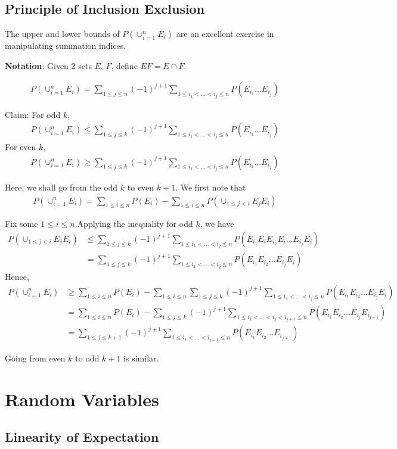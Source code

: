 \documentclass{article}
\begin{document}
\subsection{Principle of Inclusion Exclusion}
The upper and lower bounds of $P(\cup_{i=1}^n E_i)$ are an excellent exercise in manipulating summation indices.

\textbf{Notation}: Given 2 sets $E$, $F$, define $EF=E\cap F$.

\begin{align*}
	P(\cup_{i=1}^n E_i) = \sum_{1\leq j\leq n}(-1)^{j+1}\sum_{1\leq i_1 < \dots < i_j \leq n}P(E_{i_1}\dots E_{i_j})
\end{align*}

Claim:
For odd $k$,
\begin{align*}
	P(\cup_{i=1}^n E_i) \leq \sum_{1\leq j\leq k}(-1)^{j+1}\sum_{1\leq i_1 < \dots < i_j \leq n}P(E_{i_1}\dots E_{i_j})
\end{align*}
For even $k$,
\begin{align*}
	P(\cup_{i=1}^n E_i) \geq \sum_{1\leq j\leq k}(-1)^{j+1}\sum_{1\leq i_1 < \dots < i_j \leq n}P(E_{i_1}\dots E_{i_j})
\end{align*}

Here, we shall go from the odd $k$ to even $k+1$.
We first note that 
\begin{align*}
	P(\cup_{i=1}^n E_i) = \sum_{1\leq i\leq n}P(E_i) - \sum_{1\leq i\leq n}P(\cup_{1\leq j < i}E_jE_i)
\end{align*} 

Fix some $1\leq i\leq n$.Applying the inequality for odd $k$, we have
\begin{align*}
	P(\cup_{1\leq j < i}E_jE_i) &\leq \sum_{1\leq j\leq k}(-1)^{j+1}\sum_{1\leq i_1 < \dots < i_j \leq n} P(E_{i_1}E_iE_{i_2}E_i\dots E_{i_j}E_i)\\
	&= \sum_{1\leq j\leq k}(-1)^{j+1}\sum_{1\leq i_1 < \dots < i_j \leq n} P(E_{i_1}E_{i_2}\dots E_{i_j}E_i)
\end{align*}
Hence,
\begin{align*}
	P(\cup_{i=1}^n E_i) &\geq \sum_{1\leq i\leq n}P(E_i) - \sum_{1\leq i\leq n}\sum_{1\leq j\leq k}(-1)^{j+1}\sum_{1\leq i_1 < \dots < i_j \leq n} P(E_{i_1}E_{i_2}\dots E_{i_j}E_i)\\
	&= \sum_{1\leq i\leq n}P(E_i) - \sum_{1\leq j\leq k}(-1)^{j+1}\sum_{1\leq i_1 < \dots < i_j < i_{j+1} \leq n} P(E_{i_1}E_{i_2}\dots E_{i_j}E_{i_{j+1}})\\
	&= \sum_{1\leq j\leq k+1}(-1)^{j+1}\sum_{1\leq i_1 < \dots < i_{j+1} \leq n} P(E_{i_1}E_{i_2}\dots E_{i_{j+1}})
\end{align*} 

Going from even $k$ to odd $k+1$ is similar.

\section{Random Variables}
\subsection{Linearity of Expectation}
\end{document}
